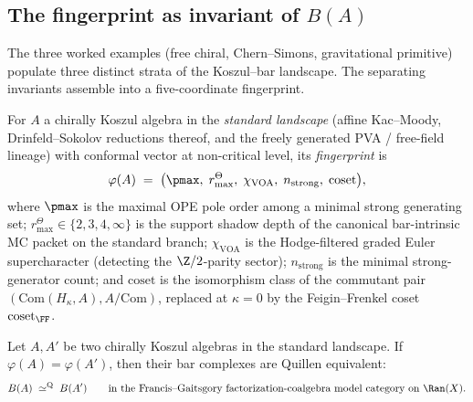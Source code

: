 \subsection{The fingerprint as invariant of $B(A)$}
\label{subsec:fingerprint-classification}

The three worked examples (free chiral, Chern--Simons, gravitational primitive) populate three distinct strata of the Koszul--bar landscape. The separating invariants assemble into a five-coordinate fingerprint.

\begin{definition}
\label{def:fingerprint}
For $A$ a chirally Koszul algebra in the \emph{standard landscape}
(affine Kac--Moody, Drinfeld--Sokolov reductions thereof, and the
freely generated PVA / free-field lineage) with conformal vector at
non-critical level, its \emph{fingerprint} is
\[
 \varphi(A) \;=\; \bigl(\pmax,\; r^\Theta_{\max},\; \chi_{\mathrm{VOA}},\; n_{\mathrm{strong}},\; \mathrm{coset}\bigr),
\]
where $\pmax$ is the maximal OPE pole order among a minimal strong
generating set; \(r^\Theta_{\max}\in \{2,3,4,\infty\}\) is the
support shadow depth of the canonical bar-intrinsic MC packet on the
standard branch; $\chi_{\mathrm{VOA}}$ is the Hodge-filtered
graded Euler supercharacter (detecting the $\Z/2$-parity sector);
$n_{\mathrm{strong}}$ is the minimal strong-generator count;
and $\mathrm{coset}$ is the isomorphism class
of the commutant pair $(\mathrm{Com}(H_\kappa, A), A/\mathrm{Com})$,
replaced at $\kappa = 0$ by the Feigin--Frenkel coset $\mathrm{coset}_{\FF}$.
\end{definition}

\begin{theorem}
\label{thm:fingerprint-completeness-standard}
Let $A, A'$ be two chirally Koszul algebras in the standard landscape.
If $\varphi(A) = \varphi(A')$, then their bar complexes are Quillen
equivalent:
\[
 B(A) \;\simeq^{\mathrm{Q}}\; B(A')
 \qquad\text{in the Francis--Gaitsgory factorization-coalgebra model category on $\Ran(X)$.}
\]
\end{theorem}

